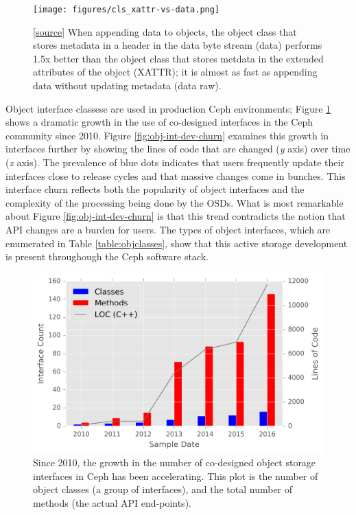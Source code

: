 \documentclass[10pt,twocolumn]{article}
\begin{document}
\begin{figure}[htbp]
\centering
\texttt{[image: figures/cls\_xattr-vs-data.png]}
\caption{{[}\href{https://github.com/michaelsevilla/malacology-popper/blob/master/experiments/figure1/visualize.ipynb}{source}{]}
When appending data to objects, the object class that stores metadata in
a header in the data byte stream (data) performs 1.5x better than the
object class that stores metdata in the extended attributes of the
object (XATTR); it is almost as fast as appending data without updating
metadata (data raw).}
\end{figure}

Object interface classese are used in production Ceph environments;
Figure \ref{fig:obj-int-dev-growth} shows a dramatic growth in the use
of co-designed interfaces in the Ceph community since 2010. Figure
\ref{fig:obj-int-dev-churn} examines this growth in interfaces further
by showing the lines of code that are changed (\emph{y} axis) over time
(\emph{x} axis). The prevalence of blue dots indicates that users
frequently update their interfaces close to release cycles and that
massive changes come in bunches. This interface churn reflects both the
popularity of object interfaces and the complexity of the processing
being done by the OSDs. What is most remarkable about Figure
\ref{fig:obj-int-dev-churn} is that this trend contradicts the notion
that API changes are a burden for users. The types of object interfaces,
which are enumerated in Table \ref{table:objclasses}, show that this
active storage development is present throughough the Ceph software
stack.

\begin{figure}[htbp]
\centering
\includegraphics{figures/obj-int-dev-growth.png}
\caption{Since 2010, the growth in the number of co-designed object
storage interfaces in Ceph has been accelerating. This plot is the
number of object classes (a group of interfaces), and the total number
of methods (the actual API end-points).\label{fig:obj-int-dev-growth}}
\end{figure}
\end{document}
